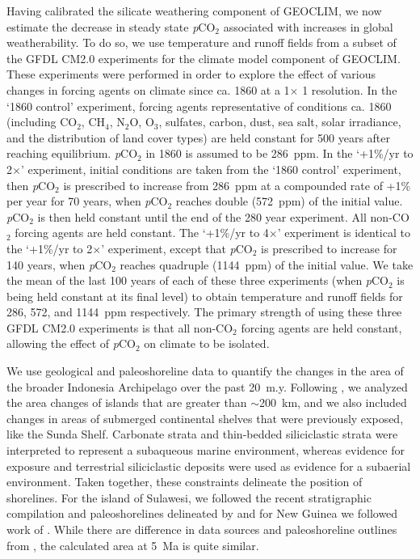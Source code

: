 \documentclass[11pt,letterpaper]{article}
\newcommand{\degrees}{\textdegree\xspace}
\newcommand{\pCOtwo}{\textit{p}CO$_{2}$\xspace}
\newcommand{\COtwo}{CO$_{2}$\xspace}
\begin{document}
Having calibrated the  silicate weathering component of GEOCLIM, we now estimate the decrease in steady state \pCOtwo associated with increases in global weatherability. To do so, we use temperature and runoff fields from a subset of the GFDL CM2.0 experiments \citep{Delworth2006a, Delworth2006b} for the climate model component of GEOCLIM. These experiments were performed in order to explore the effect of various changes in forcing agents on climate since ca. 1860 at a 1\degrees $\times$ 1\degrees resolution. In the `1860 control' experiment, forcing agents representative of conditions ca. 1860 (including \COtwo, CH$_{4}$, N$_{2}$O, O$_{3}$, sulfates, carbon, dust, sea salt, solar irradiance, and the distribution of land cover types) are held constant for 500 years after reaching equilibrium. \pCOtwo in 1860 is assumed to be 286~ppm. In the `+1\%/yr to 2$\times$' experiment, initial conditions are taken from the `1860 control' experiment, then \pCOtwo is prescribed to increase from 286~ppm at a compounded rate of +1\% per year for 70 years, when \pCOtwo reaches double (572~ppm) of the initial value. \pCOtwo is then held constant until the end of the 280 year experiment. All non-\COtwo forcing agents are held constant. The `+1\%/yr to 4$\times$' experiment is identical to the `+1\%/yr to 2$\times$' experiment, except that \pCOtwo is prescribed to increase for 140 years, when \pCOtwo reaches quadruple (1144~ppm) of the initial value. We take the mean of the last 100 years of each of these three experiments (when \pCOtwo is being held constant at its final level) to obtain temperature and runoff fields for 286, 572, and 1144~ppm respectively. The primary strength of using these three GFDL CM2.0 experiments is that all non-\COtwo forcing agents are held constant, allowing the effect of \pCOtwo on climate to be isolated.

We use geological and paleoshoreline data to quantify the changes in the area of the broader Indonesia Archipelago over the past 20~m.y. Following \citet{Molnar2015a}, we analyzed the area changes of islands that are greater than $\sim$200~km, and we also included changes in areas of submerged continental shelves that were previously exposed, like the Sunda Shelf. Carbonate strata and thin-bedded siliciclastic strata were interpreted to represent a subaqueous marine environment, whereas evidence for exposure and terrestrial siliciclastic deposits were used as evidence for a subaerial environment. Taken together, these constraints delineate the position of shorelines. For the island of Sulawesi, we followed the recent stratigraphic compilation and paleoshorelines delineated by \citet{Nugraha2018a} and for New Guinea we followed work of \citet{Norvick2003a, Cloos2005a, Gold2017a}. While there are difference in data sources and paleoshoreline outlines from \cite{Molnar2015a}, the calculated area at 5~Ma is quite similar.
\end{document}
